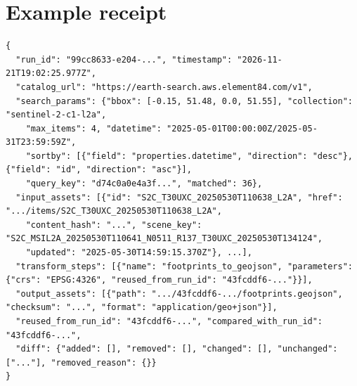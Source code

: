 \documentclass[11pt,a4paper]{article}
\begin{document}
\appendix
\section{Example receipt}
\label{app:receipt}
\begin{lstlisting}
{
  "run_id": "99cc8633-e204-...", "timestamp": "2026-11-21T19:02:25.977Z",
  "catalog_url": "https://earth-search.aws.element84.com/v1",
  "search_params": {"bbox": [-0.15, 51.48, 0.0, 51.55], "collection": "sentinel-2-c1-l2a",
    "max_items": 4, "datetime": "2025-05-01T00:00:00Z/2025-05-31T23:59:59Z",
    "sortby": [{"field": "properties.datetime", "direction": "desc"}, {"field": "id", "direction": "asc"}],
    "query_key": "d74c0a0e4a3f...", "matched": 36},
  "input_assets": [{"id": "S2C_T30UXC_20250530T110638_L2A", "href": ".../items/S2C_T30UXC_20250530T110638_L2A",
    "content_hash": "...", "scene_key": "S2C_MSIL2A_20250530T110641_N0511_R137_T30UXC_20250530T134124",
    "updated": "2025-05-30T14:59:15.370Z"}, ...],
  "transform_steps": [{"name": "footprints_to_geojson", "parameters": {"crs": "EPSG:4326", "reused_from_run_id": "43fcddf6-..."}}],
  "output_assets": [{"path": ".../43fcddf6-.../footprints.geojson", "checksum": "...", "format": "application/geo+json"}],
  "reused_from_run_id": "43fcddf6-...", "compared_with_run_id": "43fcddf6-...",
  "diff": {"added": [], "removed": [], "changed": [], "unchanged": ["..."], "removed_reason": {}}
}
\end{lstlisting}
\end{document}
